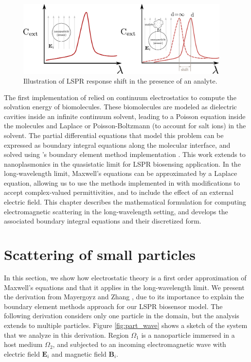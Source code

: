 \begin{figure}
   \centering
     \includegraphics[width=0.95\textwidth]{lspr_biosensing.pdf} 
     \caption{Illustration of LSPR response shift in the presence of an analyte.}
     \label{fig:lspr_bio}
\end{figure}


The first implementation of \pygbe relied on continuum electrostatics to compute the solvation energy
of biomolecules. These biomolecules are modeled as dielectric cavities inside an infinite continuum 
solvent, leading to a Poisson equation inside the molecules and Laplace or Poisson-Boltzmann
(to account for salt ions) in the solvent. The partial differential equations that model this problem
can be expressed as boundary integral equations along the molecular interface, and solved using 
\pygbe's boundary element method implementation \cite{CooperBardhanBarba2013,CooperClementiBarba2015}.
This work extends \pygbe to nanoplasmonics in the quasistatic limit for LSPR biosensing application. In the long-wavelength limit,
Maxwell's equations can be approximated by a Laplace equation, allowing us to use the methods implemented in \pygbe with modifications
to accept complex-valued permittivities, and to include the effect of an external electric field. This chapter describes the mathematical
formulation for computing electromagnetic scattering in the long-wavelength setting, and develops the associated boundary 
integral equations and their discretized form.

\section{Scattering of small particles} \label{sec:scattering_small}

In this section, we show how electrostatic theory is a first order approximation of Maxwell's 
equations and that it applies in the long-wavelength limit. We present the derivation from 
Mayergoyz and Zhang \cite{MayergoyzZhang2007}, due to its importance to explain the boundary 
element methods approach for our LSPR biosensor model. The following derivation considers only one particle 
in the domain, but the analysis extends to multiple particles. Figure \ref{fig:part_wave} shows a 
sketch of the system that we analyze in this derivation. Region $\Omega_1$ is a nanoparticle 
immersed in a host medium $\Omega_2$, and subjected to an incoming electromagnetic wave with  electric field 
$\mathbf{E}_i$ and magnetic field $\mathbf{B}_i$.

